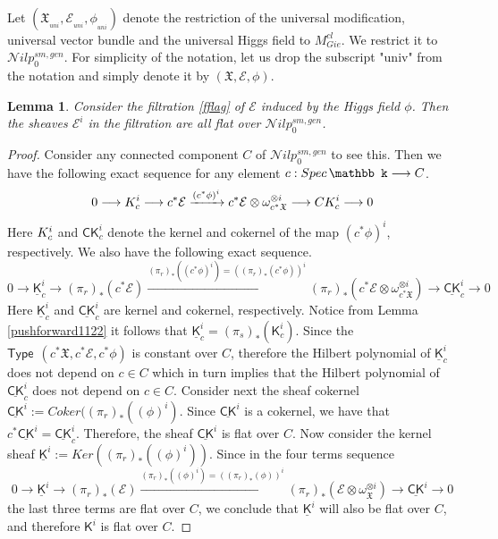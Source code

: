\documentclass[11pt]{amsart}
\newcommand {\Type} {\textsf{Type}}
\theoremstyle{plain}
\numberwithin{equation}{section}
\newcommand{\spec}{{\rm Spec}\,}
\theoremstyle{definition}
\theoremstyle{plain}
\newtheorem{Lem}[Def]{Lemma}
\begin{document}
\

Let $(\mathfrak X_{_{uni}}, \mathcal E_{_{uni}}, \phi_{_{uni}})$ denote the restriction of the universal modification, universal vector bundle and the universal Higgs field to $M^{cl}_{Gie}$. We restrict it to $\mathcal Nilp^{sm, gen}_0$. For simplicity of the notation, let us drop the subscript "univ" from the notation and simply denote it by $(\mathfrak X, \mathcal E, \phi)$.


\begin{Lem}\label{flat23}
 Consider the filtration \ref{fflag} of $\mathcal E$ induced by the Higgs field $\phi$. Then the sheaves $\mathcal E^i$ in the filtration are all flat over $\mathcal Nilp^{sm, gen}_0$. 
\end{Lem}

\begin{proof}
Consider any connected component $C$ of $\mathcal Nilp^{sm, gen}_0$ to see this. Then we have the following exact sequence for any element $c:\spec \mathbb k\longrightarrow C$.
$$
0\longrightarrow \textsf K_c^i\longrightarrow c^*\mathcal E\xrightarrow{(c^*\phi)^i} c^*\mathcal E\otimes \omega^{\otimes i}_{c^*\mathfrak X}\longrightarrow \textsf{CK}^i_c\longrightarrow 0
$$
Here $\textsf K_c^i$ and $\textsf{CK}^i_c$ denote the kernel and cokernel of the map $(c^*\phi)^i$, respectively. We also have the following exact sequence.
$$
0\longrightarrow \underline{\textsf{K}}^i_c\longrightarrow (\pi_r)_*(c^*\mathcal E)\xrightarrow{(\pi_r)_*((c^*\phi)^i)=((\pi_r)_*(c^*\phi))^i} (\pi_r)_*(c^*\mathcal E\otimes \omega^{\otimes i}_{c^*\mathfrak X})\longrightarrow \underline{\textsf{CK}}^i_c\longrightarrow 0
$$
Here $\underline{\textsf{K}}^i_c$ and $\underline{\textsf{CK}}^i_c$ are kernel and cokernel, respectively. Notice from Lemma \ref{pushforward1122} it follows that $\underline{\textsf{K}}^i_c=(\pi_s)_*(\textsf{K}^i_c)$. Since the $\Type~~(c^*{\mathfrak X}, c^*\mathcal E, c^*\phi)$ is constant over $C$, therefore the Hilbert polynomial of $\underline{\textsf{K}}^i_c$ does not depend on $c\in C$ which in turn implies that the Hilbert polynomial of $\underline{\textsf{CK}}^i_c$ does not depend on $c\in C$. Consider next the sheaf cokernel $\underline{\textsf{CK}}^i:=Coker((\pi_r)_*((\phi)^i)$. Since $\underline{\textsf{CK}}^i$ is a cokernel, we have that $c^*\underline{\textsf{CK}}^i=\underline{\textsf{CK}}^i_c$. Therefore, the sheaf $\underline{\textsf{CK}}^i$ is flat over $C$. Now consider the kernel sheaf $\underline{\textsf{K}}^i:=Ker((\pi_r)_*((\phi)^i))$. Since in the four terms sequence 
\[
0\longrightarrow \underline{\textsf{K}}^i \longrightarrow (\pi_r)_*(\mathcal E)\xrightarrow{(\pi_r)_*((\phi)^i)=((\pi_r)_*(\phi))^i} (\pi_r)_*(\mathcal E\otimes \omega^{\otimes i}_{\mathfrak X})\longrightarrow \underline{\textsf{CK}}^i\longrightarrow 0
\]
the last three terms are flat over $C$, we conclude that $\underline{\textsf{K}}^i$ will also be flat over $C$, and therefore $\textsf{K}^i$ is flat over $C$.
\end{proof}
\end{document}
